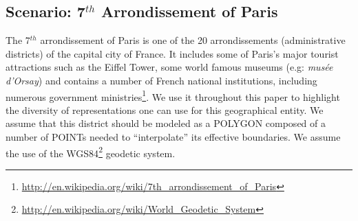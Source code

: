 \begin{itemize}
\begin{table}[!htbp]
\end{table}



\section{Scenario: 7$^{th}$ Arrondissement of Paris}                      \label{sec:scenario}

The 7$^{th}$ arrondissement of Paris is one of the 20 arrondissements (administrative districts) of the capital city of France. It includes some of Paris's major tourist attractions such as the Eiffel Tower, some world famous museums (e.g: \textit{mus\'{e}e d'Orsay}) and contains a number of French national institutions, including numerous government ministries\footnote{\url{http://en.wikipedia.org/wiki/7th_arrondissement_of_Paris}}. We use it throughout this paper to highlight the diversity of representations one can use for this geographical entity. We assume that this district should be modeled as a POLYGON composed of a number of POINTs needed to ``interpolate'' its effective boundaries. We assume the use of the WGS84\footnote{\url{http://en.wikipedia.org/wiki/World_Geodetic_System}} geodetic system.


\end{itemize}

